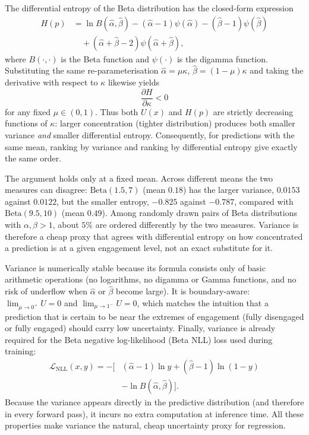 \documentclass[10pt,a4paper,twocolumn]{article}
\begin{document}
	The differential entropy of the Beta distribution has the closed-form expression
	$$
	\begin{aligned}H(p) &= \ln B(\hat{\alpha},\hat{\beta}) - (\hat{\alpha}-1)\psi(\hat{\alpha}) - (\hat{\beta}-1)\psi(\hat{\beta}) \\ &\quad + (\hat{\alpha}+\hat{\beta}-2)\psi(\hat{\alpha}+\hat{\beta}),\end{aligned}
	$$
	where $B(\cdot,\cdot)$ is the Beta function and $\psi(\cdot)$ is the digamma function.  
	Substituting the same re-parameterisation $\hat{\alpha}=\mu\kappa$, $\hat{\beta}=(1-\mu)\kappa$ and taking the derivative with respect to $\kappa$ likewise yields
	$$
	\frac{\partial H}{\partial \kappa} < 0
	$$
	for any fixed $\mu \in (0,1)$. Thus both $U(x)$ and $H(p)$ are strictly decreasing functions of $\kappa$: larger concentration (tighter distribution) produces both smaller variance \emph{and} smaller differential entropy.  
	Consequently, for predictions with the same mean, ranking by variance and ranking by differential entropy give exactly the same order.

	The argument holds only at a fixed mean. Across different means the two measures can disagree: $\mathrm{Beta}(1.5, 7)$ (mean $0.18$) has the larger variance, $0.0153$ against $0.0122$, but the smaller entropy, $-0.825$ against $-0.787$, compared with $\mathrm{Beta}(9.5, 10)$ (mean $0.49$). Among randomly drawn pairs of Beta distributions with $\alpha, \beta > 1$, about $5\%$ are ordered differently by the two measures. Variance is therefore a cheap proxy that agrees with differential entropy on how concentrated a prediction is at a given engagement level, not an exact substitute for it.
	
	Variance is numerically stable because its formula consists only of basic arithmetic operations (no logarithms, no digamma or Gamma functions, and no risk of underflow when $\hat{\alpha}$ or $\hat{\beta}$ become large).  
	It is boundary-aware: $\lim_{\mu\to 0^+}U=0$ and $\lim_{\mu\to 1^-}U=0$, which matches the intuition that a prediction that is certain to be near the extremes of engagement (fully disengaged or fully engaged) should carry low uncertainty.  
	Finally, variance is already required for the Beta negative log-likelihood (Beta NLL) loss used during training:
	$$
	\begin{aligned}\mathcal{L}_{\text{NLL}}(x, y) = -[&(\hat{\alpha}-1)\ln y + (\hat{\beta}-1)\ln(1-y) \\ &- \ln B(\hat{\alpha},\hat{\beta})].\end{aligned}
	$$
	Because the variance appears directly in the predictive distribution (and therefore in every forward pass), it incurs no extra computation at inference time.  
	All these properties make variance the natural, cheap uncertainty proxy for regression.
\end{document}
